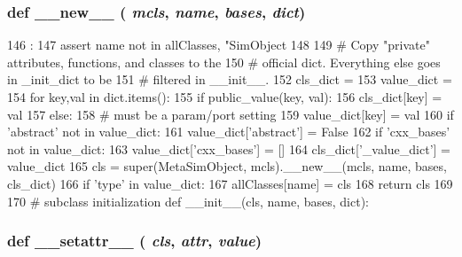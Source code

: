 \hypertarget{classm5_1_1SimObject_1_1MetaSimObject_a2f15a4676204349e06bcced484b06b70}{
\subsubsection[{\_\-\_\-new\_\-\_\-}]{\setlength{\rightskip}{0pt plus 5cm}def \_\-\_\-new\_\-\_\- ( {\em mcls}, \/   {\em name}, \/   {\em bases}, \/   {\em dict})}}
\label{classm5_1_1SimObject_1_1MetaSimObject_a2f15a4676204349e06bcced484b06b70}



\begin{DoxyCode}
146                                         :
147         assert name not in allClasses, "SimObject %
148 
149         # Copy "private" attributes, functions, and classes to the
150         # official dict.  Everything else goes in _init_dict to be
151         # filtered in __init__.
152         cls_dict = {}
153         value_dict = {}
154         for key,val in dict.items():
155             if public_value(key, val):
156                 cls_dict[key] = val
157             else:
158                 # must be a param/port setting
159                 value_dict[key] = val
160         if 'abstract' not in value_dict:
161             value_dict['abstract'] = False
162         if 'cxx_bases' not in value_dict:
163             value_dict['cxx_bases'] = []
164         cls_dict['_value_dict'] = value_dict
165         cls = super(MetaSimObject, mcls).__new__(mcls, name, bases, cls_dict)
166         if 'type' in value_dict:
167             allClasses[name] = cls
168         return cls
169 
170     # subclass initialization
    def __init__(cls, name, bases, dict):
\end{DoxyCode}
\hypertarget{classm5_1_1SimObject_1_1MetaSimObject_a6287b7a16286568d5442b6e2e90215b5}{
\subsubsection[{\_\-\_\-setattr\_\-\_\-}]{\setlength{\rightskip}{0pt plus 5cm}def \_\-\_\-setattr\_\-\_\- ( {\em cls}, \/   {\em attr}, \/   {\em value})}}
\label{classm5_1_1SimObject_1_1MetaSimObject_a6287b7a16286568d5442b6e2e90215b5}



